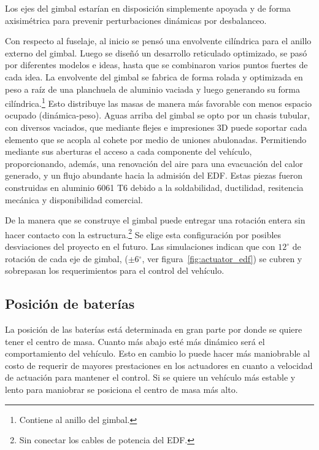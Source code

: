 \medskip 

Los ejes del gimbal estarían en disposición simplemente apoyada y de forma axisimétrica para prevenir perturbaciones dinámicas por desbalanceo.

\medskip

Con respecto al fuselaje, al inicio se pensó una envolvente cilíndrica para el anillo externo del
gimbal. Luego se diseñó un desarrollo reticulado optimizado, se pasó por diferentes modelos e
ideas, hasta que se combinaron varios puntos fuertes de cada idea. La envolvente del gimbal se fabrica de forma rolada y optimizada en peso a raíz de
una planchuela de aluminio vaciada y luego generando su forma cilíndrica.\footnote{Contiene al
anillo del gimbal.} Esto distribuye las masas de manera más favorable con menos espacio
ocupado (dinámica-peso). Aguas arriba del gimbal se opto por un chasis tubular, con diversos
vaciados, que mediante flejes e impresiones 3D puede soportar cada elemento que se acopla al cohete por
medio de uniones abulonadas. Permitiendo mediante sus aberturas el acceso a cada
componente del vehículo, proporcionando, además, una renovación del aire para una
evacuación del calor generado, y un flujo abundante hacia la admisión del EDF. Estas piezas fueron construidas en aluminio 6061 T6 debido a la soldabilidad, ductilidad, resitencia mecánica y disponibilidad comercial.

\medskip

De la manera que se construye el gimbal puede entregar una rotación entera sin hacer contacto con la estructura.\footnote{Sin conectar los cables de potencia del EDF.} Se elige esta configuración por posibles desviaciones del proyecto en el
futuro. Las simulaciones indican que con $12^\circ$ de rotación de cada eje de gimbal, ($\pm$6$^\circ$, ver figura~\ref{fig:actuator_edf}) se cubren y sobrepasan los requerimientos para el control del vehículo.

\subsection{Posición de baterías}
La posición de las baterías está determinada en gran parte por donde se quiere 
tener el centro de masa. Cuanto más abajo esté más dinámico será el comportamiento
del vehículo. Esto en cambio lo puede hacer más maniobrable al costo de requerir de
mayores prestaciones en los actuadores en cuanto a velocidad de actuación para mantener el control. Si se quiere un vehículo más estable y lento para maniobrar se posiciona el centro de masa más alto.

